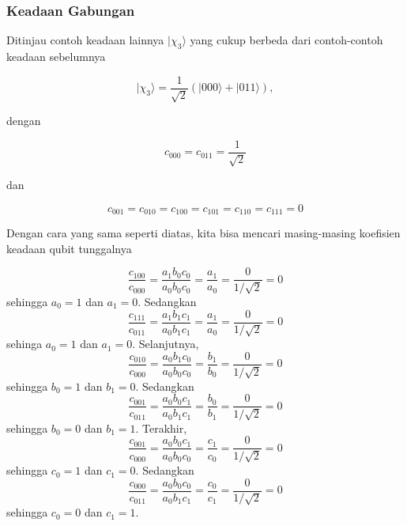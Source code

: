 \subsubsection{Keadaan Gabungan}
\par
Ditinjau contoh keadaan lainnya $|\chi_3\rangle$ yang cukup berbeda dari contoh-contoh keadaan sebelumnya

\begin{equation}
|\chi_3\rangle =
\frac{1}{\sqrt{2}}
\left(
|000\rangle + |011\rangle
\right) ,
\end{equation}

dengan

\begin{equation}
	c_{000}=c_{011}=\frac{1}{\sqrt{2}}
\end{equation}

dan

\begin{equation}
	c_{001}=c_{010}=c_{100}=c_{101}=c_{110}=c_{111}=0
\end{equation}

Dengan cara yang sama seperti diatas, kita bisa mencari masing-masing koefisien keadaan qubit tunggalnya

\begin{equation}
	\frac{c_{100}}{c_{000}}=\frac{a_1 b_0 c_0}{a_0 b_0 c_0}=\frac{a_1}{a_0}=\frac{0}{1/\sqrt{2}}=0
\end{equation}
sehingga $a_0=1$ dan $a_1=0$.
Sedangkan
\begin{equation}
	\frac{c_{111}}{c_{011}}=\frac{a_1 b_1 c_1}{a_0 b_1 c_1}=\frac{a_1}{a_0}=\frac{0}{1/\sqrt{2}}=0
\end{equation}
sehinga $a_0=1$ dan $a_1=0$. Selanjutnya,
\begin{equation}
	\frac{c_{010}}{c_{000}}=\frac{a_0 b_1 c_0}{a_0 b_0 c_0}=\frac{b_1}{b_0}=\frac{0}{1/\sqrt{2}}=0
\end{equation}
sehingga $b_0=1$ dan $b_1=0$.
Sedangkan
\begin{equation}
	\frac{c_{001}}{c_{011}}=\frac{a_0 b_0 c_1}{a_0 b_1 c_1}=\frac{b_0}{b_1}=\frac{0}{1/\sqrt{2}}=0
\end{equation}
sehingga $b_0=0$ dan $b_1=1$. Terakhir,
\begin{equation}
	\frac{c_{001}}{c_{000}}=\frac{a_0 b_0 c_1}{a_0 b_0 c_0}=\frac{c_1}{c_0}=\frac{0}{1/\sqrt{2}}=0
\end{equation}
sehingga $c_0=1$ dan $c_1=0$.
Sedangkan
\begin{equation}
	\frac{c_{000}}{c_{011}}=\frac{a_0 b_0 c_0}{a_0 b_1 c_1}=\frac{c_0}{c_1}=\frac{0}{1/\sqrt{2}}=0
\end{equation}
sehingga $c_0=0$ dan $c_1=1$.

